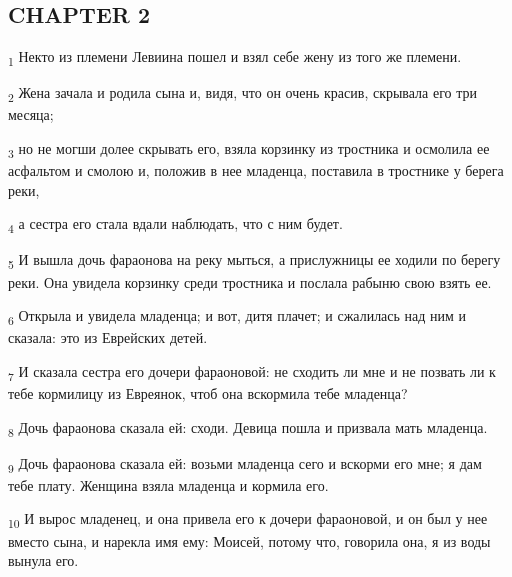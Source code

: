 \subsection{CHAPTER 2}
\begin{tcolorbox}
\textsubscript{1} Некто из племени Левиина пошел и взял себе жену из того же племени.
\end{tcolorbox}
\begin{tcolorbox}
\textsubscript{2} Жена зачала и родила сына и, видя, что он очень красив, скрывала его три месяца;
\end{tcolorbox}
\begin{tcolorbox}
\textsubscript{3} но не могши долее скрывать его, взяла корзинку из тростника и осмолила ее асфальтом и смолою и, положив в нее младенца, поставила в тростнике у берега реки,
\end{tcolorbox}
\begin{tcolorbox}
\textsubscript{4} а сестра его стала вдали наблюдать, что с ним будет.
\end{tcolorbox}
\begin{tcolorbox}
\textsubscript{5} И вышла дочь фараонова на реку мыться, а прислужницы ее ходили по берегу реки. Она увидела корзинку среди тростника и послала рабыню свою взять ее.
\end{tcolorbox}
\begin{tcolorbox}
\textsubscript{6} Открыла и увидела младенца; и вот, дитя плачет; и сжалилась над ним и сказала: это из Еврейских детей.
\end{tcolorbox}
\begin{tcolorbox}
\textsubscript{7} И сказала сестра его дочери фараоновой: не сходить ли мне и не позвать ли к тебе кормилицу из Евреянок, чтоб она вскормила тебе младенца?
\end{tcolorbox}
\begin{tcolorbox}
\textsubscript{8} Дочь фараонова сказала ей: сходи. Девица пошла и призвала мать младенца.
\end{tcolorbox}
\begin{tcolorbox}
\textsubscript{9} Дочь фараонова сказала ей: возьми младенца сего и вскорми его мне; я дам тебе плату. Женщина взяла младенца и кормила его.
\end{tcolorbox}
\begin{tcolorbox}
\textsubscript{10} И вырос младенец, и она привела его к дочери фараоновой, и он был у нее вместо сына, и нарекла имя ему: Моисей, потому что, говорила она, я из воды вынула его.
\end{tcolorbox}
